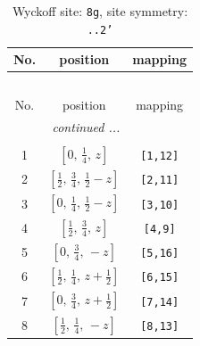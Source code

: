\documentclass[fleqn,8pt]{jsarticle}
\begin{document}
\begin{longtable}{ccc}
\caption{Wyckoff site: {\tt 8g}, site symmetry: {\tt ..2'}}
 \\
 \hline \hline
No. & position & mapping \\ \hline \endfirsthead

\multicolumn{2}{l}{\tablename\ \thetable{}} \\
 \hline \hline
No. & position & mapping \\ \hline \endhead

 \hline \hline
\multicolumn{2}{r}{\footnotesize\it continued ...} \\ \endfoot

 \hline \hline
\multicolumn{2}{r}{} \\ \endlastfoot

1 & $\left[ 0,\, \frac{1}{4},\, z \right]$ & {\tt [1,12]} \\ \hline
2 & $\left[ \frac{1}{2},\, \frac{3}{4},\, \frac{1}{2} - z \right]$ & {\tt [2,11]} \\ \hline
3 & $\left[ 0,\, \frac{1}{4},\, \frac{1}{2} - z \right]$ & {\tt [3,10]} \\ \hline
4 & $\left[ \frac{1}{2},\, \frac{3}{4},\, z \right]$ & {\tt [4,9]} \\ \hline
5 & $\left[ 0,\, \frac{3}{4},\, - z \right]$ & {\tt [5,16]} \\ \hline
6 & $\left[ \frac{1}{2},\, \frac{1}{4},\, z + \frac{1}{2} \right]$ & {\tt [6,15]} \\ \hline
7 & $\left[ 0,\, \frac{3}{4},\, z + \frac{1}{2} \right]$ & {\tt [7,14]} \\ \hline
8 & $\left[ \frac{1}{2},\, \frac{1}{4},\, - z \right]$ & {\tt [8,13]} \\
\end{longtable}
\renewcommand{\arraystretch}{1.2}
\end{document}
